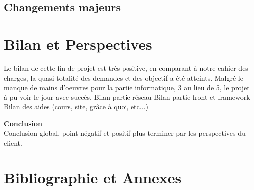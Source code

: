 \documentclass{report}
\begin{document}
\section{Changements majeurs}%

\chapter{Bilan et Perspectives} %
Le bilan de cette fin de projet est très positive, en comparant à notre cahier des charges, la quasi totalité des demandes et des objectif a été atteints. Malgré le manque de mains d'oeuvres pour la partie informatique, 3 au lieu de 5, le projet à pu voir le jour avec succès.
Bilan partie réseau
Bilan partie front et framework
Bilan des aides (cours, site, grâce à quoi, etc...)

\vspace{1cm}
\textbf{\huge{}{Conclusion}}\\

Conclusion global, point négatif et positif plus terminer par les perspectives du client.

\chapter{Bibliographie et Annexes}
\end{document}
